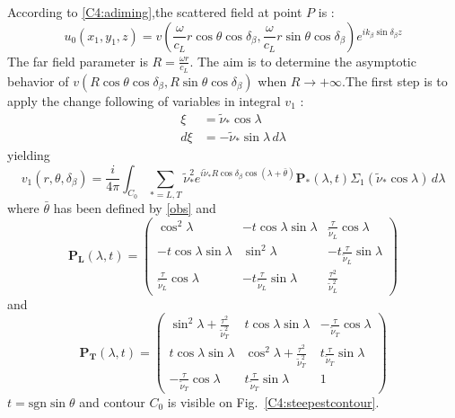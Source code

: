 According to \eqref{C4:adiming},the scattered field at point $P$ is :
\begin{equation}
u_0(x_1,y_1,z)=v(\frac{\omega}{c_L}r\cos\theta\cos\delta_{\beta},\frac{\omega}{c_L}r\sin\theta\cos\delta_{\beta})e^{ik_{\beta}\sin\delta_{\beta}z}
\end{equation}
The far field parameter is $R=\frac{\omega r}{c_L}$. The aim is to determine the asymptotic behavior of $v(R\cos\theta\cos\delta_{\beta},R\sin\theta\cos\delta_{\beta})$ when $R\rightarrow +\infty$.The first step is to apply the change following of variables in integral $v_1$ :
\begin{equation}
\begin{split}
\xi&=\tilde{\nu}_*\cos\lambda \\
d\xi&=-\tilde{\nu}_*\sin\lambda\, d\lambda
\end{split}
\label{C4:changevar2}
\end{equation}
yielding
\begin{equation}
v_1(r,\theta,\delta_{\beta})=\frac{i}{4\pi} \int_{C_0}\sum_{*=L,T}\tilde{\nu}_*^2 e^{i\tilde{\nu}_*R\cos\delta_{\beta}\cos(\lambda+\bar{\theta})}\mathbf{ P_*}(\lambda,t)\Sigma_1(\tilde{\nu}_*\cos\lambda) \, d \lambda
\label{C4:v1C0}
\end{equation}
where $\bar{\theta}$ has been defined by \eqref{obs} and
\begin{equation}
\mathbf{P_L}(\lambda,t)=
\begin{pmatrix}
\cos^2\lambda & -t\cos\lambda\sin\lambda &\frac{\tau}{\tilde{\nu}_L} \cos\lambda \\
-t\cos\lambda\sin\lambda & \sin^2\lambda&-t\frac{\tau}{\tilde{\nu}_L}\sin\lambda \\
\frac{\tau}{\tilde{\nu}_L} \cos\lambda&-t\frac{\tau}{\tilde{\nu}_L}\sin\lambda&\frac{\tau^2}{\tilde{\nu}_L^2}
\end{pmatrix}
\end{equation}
and
\begin{equation}
\mathbf{P_T}(\lambda,t)=
\begin{pmatrix}
\sin^2\lambda+\frac{\tau^2}{\tilde{\nu}_T^2} & t\cos\lambda\sin\lambda &-\frac{\tau}{\tilde{\nu}_T}\cos\lambda \\
t\cos\lambda\sin\lambda & \cos^2\lambda+\frac{\tau^2}{\tilde{\nu}_T^2}&t\frac{\tau}{\tilde{\nu}_T}\sin\lambda \\
-\frac{\tau}{\tilde{\nu}_T}\cos\lambda&t\frac{\tau}{\tilde{\nu}_T}\sin\lambda&1
\end{pmatrix}
\end{equation}
$t=\mbox{sgn} \sin\theta$ and contour $C_0$ is visible on Fig.~\ref{C4:steepestcontour}.

